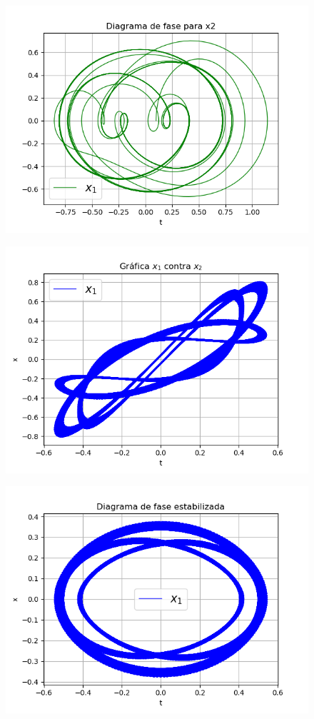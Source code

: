 \documentclass{article}
\begin{document}
\begin{figure}[H]
	\centering
    \includegraphics[width=\linewidth]{41_f2.png}
\end{figure}
\begin{figure}[H]
	\centering
    \includegraphics[width=\linewidth]{41_v.png}
\end{figure}
\begin{figure}[H]
	\centering
    \includegraphics[width=\linewidth]{41_fe1.png}
\end{figure}
\end{document}
